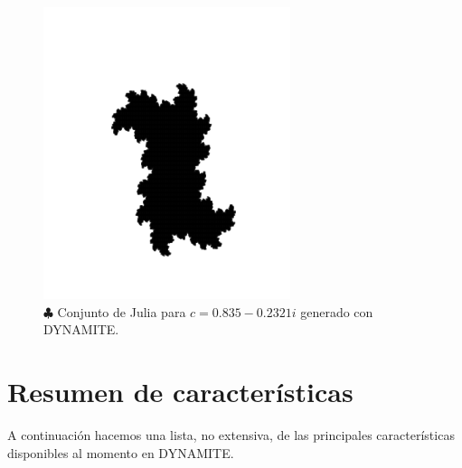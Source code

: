 \begin{figure}[!ht] \centering
	\includegraphics[scale=0.7]{figures/juliaset.png}
	\caption{$\clubsuit$ Conjunto de Julia para $c = 0.835 - 0.2321i$ generado con DYNAMITE.}
	\label{fig:dynamite}
\end{figure}

\section{Resumen de características}

A continuación hacemos una lista, no extensiva, de las principales características disponibles al momento en DYNAMITE.

